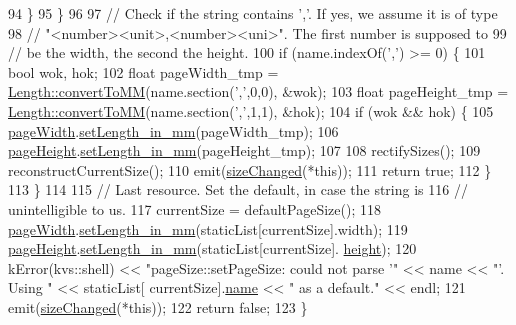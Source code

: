 \begin{DoxyCode}
94     \}
95   \}
96 
97   \textcolor{comment}{// Check if the string contains ','. If yes, we assume it is of type}
98   \textcolor{comment}{// "<number><unit>,<number><uni>". The first number is supposed to}
99   \textcolor{comment}{// be the width, the second the height.}
100   \textcolor{keywordflow}{if} (name.indexOf(\textcolor{charliteral}{','}) >= 0) \{
101     \textcolor{keywordtype}{bool} wok, hok;
102     \textcolor{keywordtype}{float} pageWidth\_tmp  = \hyperlink{classLength_a0831070f01a1220c5741f087e0585373}{Length::convertToMM}(name.section(\textcolor{charliteral}{','},0,0), &wok);
103     \textcolor{keywordtype}{float} pageHeight\_tmp = \hyperlink{classLength_a0831070f01a1220c5741f087e0585373}{Length::convertToMM}(name.section(\textcolor{charliteral}{','},1,1), &hok);
104     \textcolor{keywordflow}{if} (wok && hok) \{
105       \hyperlink{classSimplePageSize_ad5aa26a1789bd7b20dbca509a50cfcab}{pageWidth}.\hyperlink{classLength_ae3aabced262567871a1df58c1a878b60}{setLength\_in\_mm}(pageWidth\_tmp);
106       \hyperlink{classSimplePageSize_a0e0bc8a9833d9c276f96e6fda5c64cf7}{pageHeight}.\hyperlink{classLength_ae3aabced262567871a1df58c1a878b60}{setLength\_in\_mm}(pageHeight\_tmp);
107 
108       rectifySizes();
109       reconstructCurrentSize();
110       emit(\hyperlink{classpageSize_ae49ee59892403f920d614d0c8d9daa5b}{sizeChanged}(*\textcolor{keyword}{this}));
111       \textcolor{keywordflow}{return} \textcolor{keyword}{true};
112     \}
113   \}
114 
115   \textcolor{comment}{// Last resource. Set the default, in case the string is}
116   \textcolor{comment}{// unintelligible to us.}
117   currentSize = defaultPageSize();
118   \hyperlink{classSimplePageSize_ad5aa26a1789bd7b20dbca509a50cfcab}{pageWidth}.\hyperlink{classLength_ae3aabced262567871a1df58c1a878b60}{setLength\_in\_mm}(staticList[currentSize].width);
119   \hyperlink{classSimplePageSize_a0e0bc8a9833d9c276f96e6fda5c64cf7}{pageHeight}.\hyperlink{classLength_ae3aabced262567871a1df58c1a878b60}{setLength\_in\_mm}(staticList[currentSize].
      \hyperlink{classSimplePageSize_a8df6b43628bff9c8b53f26cc478640c5}{height});
120   kError(kvs::shell) << \textcolor{stringliteral}{"pageSize::setPageSize: could not parse '"} << name << \textcolor{stringliteral}{"'. Using "} << staticList[
      currentSize].\hyperlink{structpageSizeItem_aeabfea4a5413a25c81fa32cf0dde3d44}{name} << \textcolor{stringliteral}{" as a default."} << endl;
121   emit(\hyperlink{classpageSize_ae49ee59892403f920d614d0c8d9daa5b}{sizeChanged}(*\textcolor{keyword}{this}));
122   \textcolor{keywordflow}{return} \textcolor{keyword}{false};
123 \}
\end{DoxyCode}
